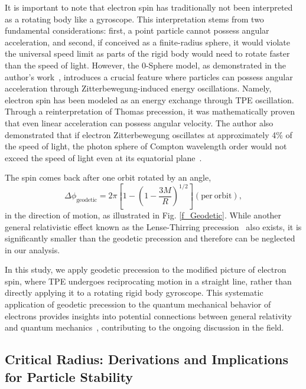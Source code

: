 \documentclass[%
 reprint,
 amsmath,amssymb,
 aps,
]{revtex4-1}
\numberwithin{equation}{section}%
\begin{document}
It is important to note that electron spin has traditionally not been interpreted as a rotating body like a gyroscope. This interpretation stems from two fundamental considerations: first, a point particle cannot possess angular acceleration, and second, if conceived as a finite-radius sphere, it would violate the universal speed limit as parts of the rigid body would need to rotate faster than the speed of light. However, the 0-Sphere model, as demonstrated in the author's work~\cite{Hanamura2023}, introduces a crucial feature where particles can possess angular acceleration through Zitterbewegung-induced energy oscillations. Namely, electron spin has been modeled as an energy exchange through TPE oscillation. Through a reinterpretation of Thomas precession, it was mathematically proven that even linear acceleration can possess angular velocity. The author also demonstrated that if electron Zitterbewegung oscillates at approximately 4\% of the speed of light, the photon sphere of Compton wavelength order would not exceed the speed of light even at its equatorial plane~\cite{Hanamura2025-1}.

The spin comes back after one orbit rotated by an angle,
\begin{equation}
\Delta \phi_{\mathrm{geodetic}} = 2 \pi \left[ 1 - \left( 1 - \frac{3M}{R} \right)^{1/2} \right] \mathrm{(per \ orbit)},
\label{eq:Geodetic}
\end{equation}
in the direction of motion, as illustrated in Fig. \ref{f_Geodetic}. While another general relativistic effect known as the Lense-Thirring precession~\cite{LenseThirring1918} also exists, it is significantly smaller than the geodetic precession and therefore can be neglected in our analysis. 

In this study, we apply geodetic precession to the modified picture of electron spin, where TPE undergoes reciprocating motion in a straight line, rather than directly applying it to a rotating rigid body gyroscope. This systematic application of geodetic precession to the quantum mechanical behavior of electrons provides insights into potential connections between general relativity and quantum mechanics~\cite{Penrose1996}, contributing to the ongoing discussion in the field.


\subsection{Critical Radius: Derivations and Implications for Particle Stability}
\label{sec:CriticalRadiusDerivations}
\end{document}
